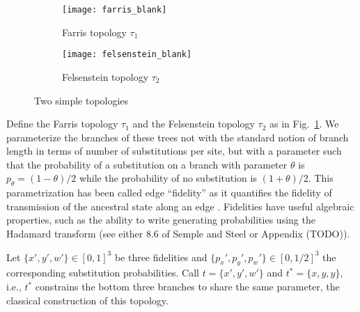 \begin{figure}
\centering
\begin{subfigure}{.45\linewidth}
\centering
\texttt{[image: farris\_blank]}
\caption[short]{Farris topology $\tau_1$}
\end{subfigure}
\begin{subfigure}{.45\linewidth}
\centering
\texttt{[image: felsenstein\_blank]}
\caption[short]{Felsenstein topology $\tau_2$}
\end{subfigure}
\caption{Two simple topologies}
\label{fig:farris-fels-top}
\end{figure}

Define the Farris topology $\tau_1$ and the Felsenstein topology $\tau_2$ as in Fig.~\ref{fig:farris-fels-top}.
We parameterize the branches of these trees not with the standard notion of branch length in terms of number of substitutions per site, but with a parameter such that the probability of a substitution on a branch with parameter $\theta$ is $p_\theta = (1-\theta)/2$ while the probability of no substitution is $(1+\theta)/2$.
This parametrization has been called edge ``fidelity'' as it quantifies the fidelity of transmission of the ancestral state along an edge \cite{Matsen2007-jq}.
Fidelities have useful algebraic properties, such as the ability to write generating probabilities using the Hadamard transform (see either 8.6 of Semple and Steel \cite{Semple2003-em} or Appendix (TODO)).

Let $\{x',y',w'\}\in[0,1]^3$ be three fidelities and $\{p_x',p_y',p_w'\}\in[0,1/2]^3$ the corresponding substitution probabilities.
Call $t=\{x',y',w'\}$ and $t^*=\{x,y,y\}$, i.e., $t^*$ constrains the bottom three branches to share the same parameter, the classical construction of this topology.

